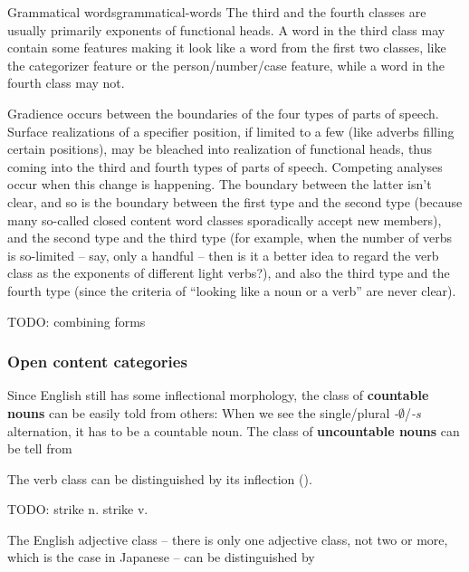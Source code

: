 \documentclass[UTF8, a4paper, oneside, scheme=plain]{ctexrep}
\newcommand*{\citepage}[1]{p.~{#1}}
\newcommand*{\concept}[1]{\textbf{#1}}
\newcommand{\corpus}[1]{\emph{#1}}
\newcommand{\emptymorpheme}{$\emptyset$}
\begin{document}
\begin{theorybox}{Grammatical words}{grammatical-words}
    The third and the fourth classes are usually primarily exponents of functional heads.
    A word in the third class may contain some features making it look like a word from the first two classes,
    like the categorizer feature or the person/number/case feature,
    while a word in the fourth class may not.

    Gradience occurs between the boundaries of the four types of parts of speech.
    Surface realizations of a specifier position,
    if limited to a few (like adverbs filling certain positions),
    may be bleached into realization of functional heads,
    thus coming into the third and fourth types of parts of speech.
    Competing analyses occur when this change is happening.
    The boundary between the latter isn't clear,
    and so is the boundary between the first type and the second type
    (because many so-called closed content word classes 
    sporadically accept new members),
    and the second type and the third type
    (for example, when the number of verbs is so-limited -- say, only a handful -- 
    then is it a better idea to regard the verb class as the exponents of different light verbs?),
    and also the third type and the fourth type
    (since the criteria of ``looking like a noun or a verb'' are never clear).
\end{theorybox}

TODO: combining forms \citep[\citepage{1661}]{cgel}

\subsubsection{Open content categories}

Since English still has some inflectional morphology,
the class of \concept{countable nouns} can be easily told from others:
When we see the single/plural \corpus{-\emptymorpheme}/\corpus{-s} alternation, it has to be a countable noun.
The class of \concept{uncountable nouns} can be tell from 

The verb class can be distinguished by its inflection (). 

TODO: strike n. strike v.

The English adjective class -- there is only one adjective class, not two or more,
which is the case in Japanese -- 
can be distinguished by 
\end{document}
